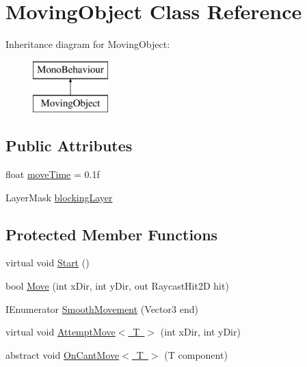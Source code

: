 \hypertarget{class_moving_object}{}\section{Moving\+Object Class Reference}
\label{class_moving_object}
Inheritance diagram for Moving\+Object\+:\begin{figure}[H]
\begin{center}
\leavevmode
\includegraphics[height=2.000000cm]{class_moving_object}
\end{center}
\end{figure}
\subsection*{Public Attributes}
\begin{DoxyCompactItemize}
\item 
float \mbox{\hyperlink{class_moving_object_a2596eb0312a148176541ac08fb18b173}{move\+Time}} = 0.\+1f
\item 
Layer\+Mask \mbox{\hyperlink{class_moving_object_add4cf20e336559d38cc6a57763775e36}{blocking\+Layer}}
\end{DoxyCompactItemize}
\subsection*{Protected Member Functions}
\begin{DoxyCompactItemize}
\item 
virtual void \mbox{\hyperlink{class_moving_object_a2b6026a8e7e4313764cb876fd99ae1cd}{Start}} ()
\item 
bool \mbox{\hyperlink{class_moving_object_a0a7da7115f17445fcfe898d3ce16b85b}{Move}} (int x\+Dir, int y\+Dir, out Raycast\+Hit2D hit)
\item 
I\+Enumerator \mbox{\hyperlink{class_moving_object_ab5b0553c2da577c976c7f1416ff6605a}{Smooth\+Movement}} (Vector3 end)
\item 
virtual void \mbox{\hyperlink{class_moving_object_a593c3433bf277e5fe6b80ab1b475aad4}{Attempt\+Move$<$ T $>$}} (int x\+Dir, int y\+Dir)
\item 
abstract void \mbox{\hyperlink{class_moving_object_af20de314364d109abfad1fe0f15d4732}{On\+Cant\+Move$<$ T $>$}} (T component)
\end{DoxyCompactItemize}


